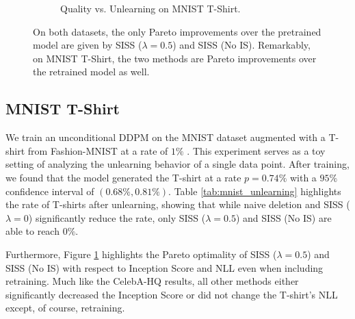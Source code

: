 \documentclass{article} \usepackage{iclr2025_conference,times}
\renewcommand{\cite}{\citep}
\begin{document}
\begin{figure}
\begin{subfigure}[b]{0.48\textwidth}
        \caption{Quality vs. Unlearning on MNIST T-Shirt.}
        \label{fig:mnist_pareto}
    \end{subfigure}
    \caption{On both datasets, the only Pareto improvements over the pretrained model are given by SISS ($\lambda=0.5$) and SISS (No IS). Remarkably, on MNIST T-Shirt, the two methods are Pareto improvements over the retrained model as well.}
    \label{fig:pareto_optimality}
\end{figure}


\subsection{MNIST T-Shirt}
We train an unconditional DDPM on the MNIST dataset augmented with a T-shirt from Fashion-MNIST at a rate of $1\%$ \cite{xiao2017fashionmnist}. This experiment serves as a toy setting of analyzing the unlearning behavior of a single data point. After training, we found that the model generated the T-shirt at a rate $p=0.74\%$ with a $95\%$ confidence interval of $(0.68\%, 0.81\%)$. Table \ref{tab:mnist_unlearning} highlights the rate of T-shirts after unlearning, showing that while naive deletion and SISS ($\lambda=0$) significantly reduce the rate, only SISS ($\lambda=0.5$) and SISS (No IS) are able to reach $0\%$. 

Furthermore, Figure \ref{fig:mnist_pareto} highlights the Pareto optimality of SISS ($\lambda=0.5$) and SISS (No IS) with respect to Inception Score and NLL even when including retraining. Much like the CelebA-HQ results, all other methods either significantly decreased the Inception Score or did not change the T-shirt's NLL except, of course, retraining.
\end{document}
